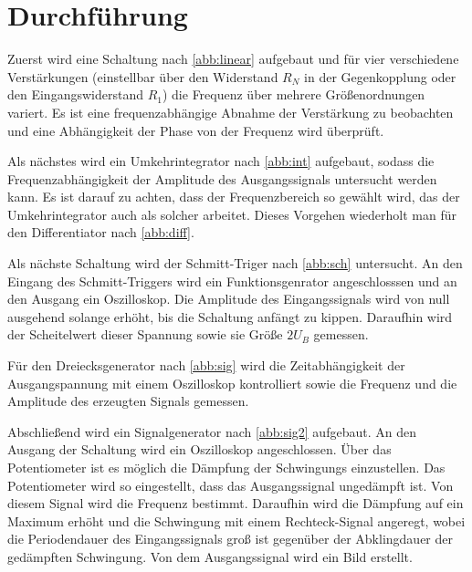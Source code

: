 \section{Durchf{\"u}hrung}
Zuerst wird eine Schaltung nach \autoref{abb:linear} aufgebaut und für vier verschiedene Verstärkungen (einstellbar über den Widerstand $R_N$ in der Gegenkopplung oder den Eingangswiderstand $R_1$)
die Frequenz über mehrere Größenordnungen variert. Es ist eine frequenzabhängige Abnahme der Verstärkung zu beobachten und eine Abhängigkeit der Phase von der Frequenz wird überprüft.

Als nächstes wird ein Umkehrintegrator nach \autoref{abb:int} aufgebaut, sodass die
Frequenzabhängigkeit der Amplitude des Ausgangssignals untersucht werden kann. Es
ist darauf zu achten, dass der Frequenzbereich so gewählt wird, das der Umkehrintegrator
auch als solcher arbeitet. Dieses Vorgehen wiederholt man für den Differentiator nach \autoref{abb:diff}.

Als nächste Schaltung wird der Schmitt-Triger nach \autoref{abb:sch} untersucht.
An den Eingang des Schmitt-Triggers wird ein Funktionsgenrator angeschlosssen und an den Ausgang
ein Oszilloskop. Die Amplitude des Eingangssignals wird von null ausgehend solange erhöht,
bis die Schaltung anfängt zu kippen. Daraufhin wird der Scheitelwert dieser Spannung sowie
sie Größe $2U_B$ gemessen.

Für den Dreiecksgenerator nach \autoref{abb:sig} wird die Zeitabhängigkeit der Ausgangspannung mit einem
Oszilloskop kontrolliert sowie die Frequenz und die Amplitude des erzeugten Signals gemessen.

Abschließend wird ein Signalgenerator nach \autoref{abb:sig2} aufgebaut. An den Ausgang der Schaltung
wird ein Oszilloskop angeschlossen. Über das Potentiometer ist es möglich die Dämpfung der Schwingungs
einzustellen. Das Potentiometer wird so eingestellt, dass das Ausgangssignal ungedämpft ist. Von diesem Signal wird
die Frequenz bestimmt. Daraufhin wird die Dämpfung auf ein Maximum erhöht und
die Schwingung mit einem Rechteck-Signal angeregt, wobei die Periodendauer des Eingangssignals groß ist
gegenüber der Abklingdauer der gedämpften Schwingung. Von dem Ausgangssignal wird ein Bild erstellt.
